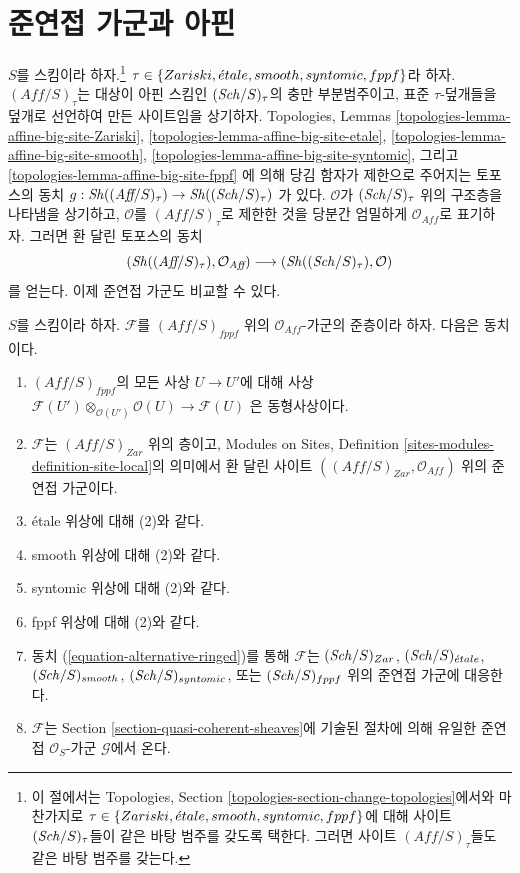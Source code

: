 \section{준연접 가군과 아핀}
\label{section-alternative-quasi-coherent}

\noindent
$S$를 스킴이라 하자.\footnote{이 절에서는 Topologies, Section
\ref{topologies-section-change-topologies}에서와 마찬가지로
$\tau \in \{Zariski, {\acute{e}tale}, smooth, syntomic, fppf\}$에 대해 사이트
$(\mathit{Sch}/S)_\tau$들이 같은 바탕 범주를 갖도록 택한다. 그러면 사이트
$(\textit{Aff}/S)_\tau$들도 같은 바탕 범주를 갖는다.}
$\tau \in \{Zariski, {\acute{e}tale}, smooth, syntomic, fppf\}$라 하자.
$(\textit{Aff}/S)_\tau$는 대상이 아핀 스킴인 $(\mathit{Sch}/S)_\tau$의
충만 부분범주이고, 표준 $\tau$-덮개들을 덮개로 선언하여 만든
사이트임을 상기하자. Topologies, Lemmas
\ref{topologies-lemma-affine-big-site-Zariski},
\ref{topologies-lemma-affine-big-site-etale},
\ref{topologies-lemma-affine-big-site-smooth},
\ref{topologies-lemma-affine-big-site-syntomic}, 그리고
\ref{topologies-lemma-affine-big-site-fppf}
에 의해 당김 함자가 제한으로 주어지는 토포스의 동치
$g : \mathop{\mathit{Sh}}\nolimits((\textit{Aff}/S)_\tau) \to \mathop{\mathit{Sh}}\nolimits((\mathit{Sch}/S)_\tau)$
가 있다. $\mathcal{O}$가 $(\mathit{Sch}/S)_\tau$ 위의 구조층을 나타냄을 상기하고,
$\mathcal{O}$를 $(\textit{Aff}/S)_\tau$로 제한한 것을 당분간 엄밀하게
$\mathcal{O}_{\textit{Aff}}$로 표기하자. 그러면 환 달린 토포스의 동치
\begin{equation}
\label{equation-alternative-ringed}
(\mathop{\mathit{Sh}}\nolimits((\textit{Aff}/S)_\tau), \mathcal{O}_{\textit{Aff}})
\longrightarrow
(\mathop{\mathit{Sh}}\nolimits((\mathit{Sch}/S)_\tau), \mathcal{O})
\end{equation}
를 얻는다. 이제 준연접 가군도 비교할 수 있다.

\begin{lemma}
\label{lemma-quasi-coherent-alternative}
$S$를 스킴이라 하자. $\mathcal{F}$를 $(\textit{Aff}/S)_{fppf}$ 위의
$\mathcal{O}_{\textit{Aff}}$-가군의 준층이라 하자. 다음은 동치이다.
\begin{enumerate}
\item $(\textit{Aff}/S)_{fppf}$의 모든 사상 $U \to U'$에 대해 사상
$\mathcal{F}(U') \otimes_{\mathcal{O}(U')} \mathcal{O}(U) \to \mathcal{F}(U)$
은 동형사상이다.
\item $\mathcal{F}$는 $(\textit{Aff}/S)_{Zar}$ 위의 층이고, Modules on Sites,
Definition \ref{sites-modules-definition-site-local}의 의미에서 환 달린 사이트
$((\textit{Aff}/S)_{Zar}, \mathcal{O}_{\textit{Aff}})$ 위의 준연접 가군이다.
\item \'etale 위상에 대해 (2)와 같다.
\item smooth 위상에 대해 (2)와 같다.
\item syntomic 위상에 대해 (2)와 같다.
\item fppf 위상에 대해 (2)와 같다.
\item 동치 (\ref{equation-alternative-ringed})를 통해 $\mathcal{F}$는
$(\mathit{Sch}/S)_{Zar}$,
$(\mathit{Sch}/S)_{\acute{e}tale}$,
$(\mathit{Sch}/S)_{smooth}$,
$(\mathit{Sch}/S)_{syntomic}$, 또는
$(\mathit{Sch}/S)_{fppf}$
위의 준연접 가군에 대응한다.
\item $\mathcal{F}$는 Section \ref{section-quasi-coherent-sheaves}에 기술된
절차에 의해 유일한 준연접 $\mathcal{O}_S$-가군 $\mathcal{G}$에서 온다.
\end{enumerate}
\end{lemma}

